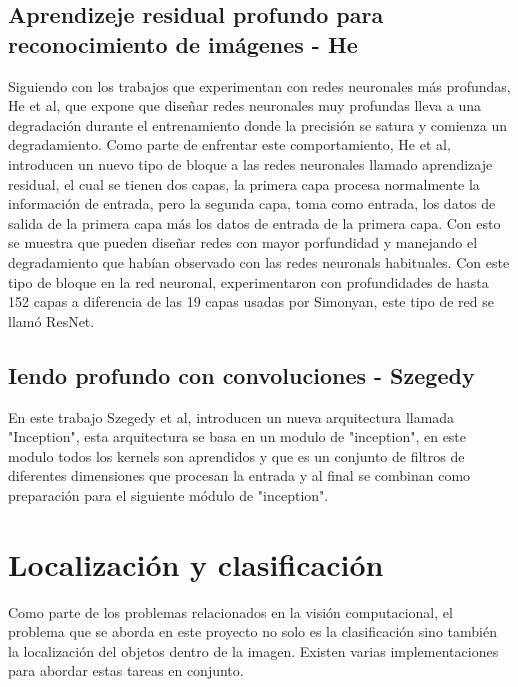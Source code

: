 \subsection{Aprendizeje residual profundo para reconocimiento de imágenes - He}
Siguiendo con los trabajos que experimentan con redes neuronales más profundas, He et al, que expone que diseñar redes neuronales muy profundas lleva a una degradación durante el entrenamiento donde la precisión se satura y comienza un degradamiento. Como parte de enfrentar este comportamiento, He et al, introducen un nuevo tipo de bloque a las redes neuronales llamado aprendizaje residual, el cual se tienen dos capas, la primera capa procesa normalmente la información de entrada, pero la segunda capa, toma como entrada, los datos de salida de la primera capa más los datos de entrada de la primera capa. Con esto se muestra que pueden diseñar redes con mayor porfundidad y manejando el degradamiento que habían observado con las redes neuronals habituales. Con este tipo de bloque en la red neuronal, experimentaron con profundidades de hasta 152 capas a diferencia de las 19 capas usadas por Simonyan, este tipo de red se llamó ResNet.

\subsection{Iendo profundo con convoluciones - Szegedy}
En este trabajo Szegedy et al, introducen un nueva arquitectura llamada "Inception", esta arquitectura se basa en un modulo de "inception", en este modulo todos los kernels son aprendidos y que es un conjunto de filtros de diferentes dimensiones que procesan la entrada y al final se combinan como preparación para el siguiente módulo de "inception".

\section{Localización y clasificación}
Como parte de los problemas relacionados en la visión computacional, el problema que se aborda en este proyecto no solo es la clasificación sino también la localización del objetos dentro de la imagen. Existen varias implementaciones para abordar estas tareas en conjunto.

